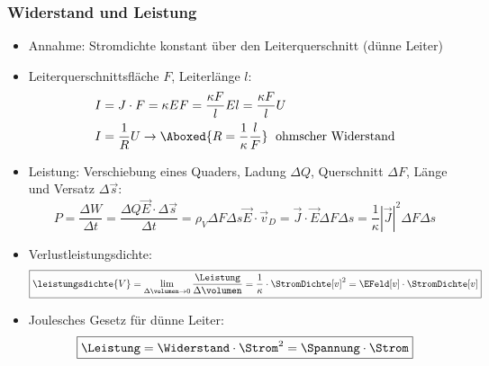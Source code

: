 \begin{frame}
  \frametitle{Widerstand und Leistung}
\begin{itemize}[<+->]      
\item Annahme: Stromdichte konstant über den Leiterquerschnitt (dünne Leiter)
\item Leiterquerschnittsfläche $F$, Leiterlänge $l$:
  \begin{align*}
    I&=J\cdot F =\kappa E F = \frac{\kappa F}{l} El = \frac{\kappa F}{l} U\\
    I&= \frac{1}{R} U \to \Aboxed{R = \frac{1}{\kappa} \frac{l}{F}}\;\text{ ohmscher Widerstand}
  \end{align*}
\item Leistung: Verschiebung eines Quaders, Ladung $\Delta Q$, Querschnitt $\Delta F$, Länge und Versatz $\Delta\vec{s}$:
  $$
  P = \frac{\Delta W}{\Delta t} = \frac{\Delta Q \vec{E}\cdot \Delta\vec{s}}{\Delta t}
  = \rho_V\Delta F\Delta s \vec{E}\cdot\vec{v}_D = \vec{J}\cdot \vec{E} \Delta F\Delta s = \frac{1}{\kappa}|\vec{J}|^2\Delta F\Delta s$$
\item Verlustleistungsdichte:
\begin{equation*}
	\boxed{\leistungsdichte{V} = \lim\limits_{\Delta \volumen \rightarrow 0} \dfrac{\Leistung}{\Delta \volumen} = \dfrac{1}{\kappa} \cdot \StromDichte[v]^2 = \EFeld[v] \cdot \StromDichte[v]}
\end{equation*}
\item \alert{Joulesches Gesetz} für dünne Leiter:
  \begin{equation*}
	\boxed{\Leistung = \Widerstand \cdot \Strom^2 = \Spannung \cdot \Strom}
\end{equation*}

  \end{itemize}
\end{frame}

